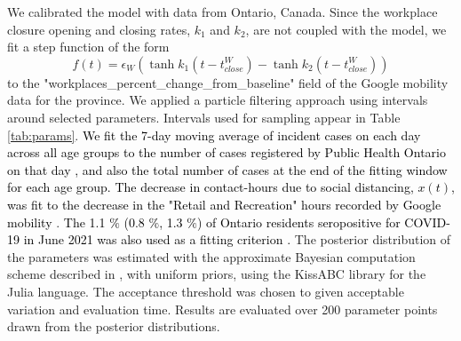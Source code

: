 We calibrated the model with data from Ontario, Canada. Since the workplace closure opening and closing rates, $k_1$ and $k_2$, are not coupled with the model, we fit a step function of the form $$f(t) = \epsilon_W \left( \tanh{k_1(t - t^W_{close})} - \tanh{k_2(t - t^W_{close})}\right)$$ to the \textrm{"workplaces\_percent\_change\_from\_baseline"} field of the Google mobility data \cite{googlemobility} for the province. We applied a particle filtering approach using intervals around selected parameters. Intervals used for sampling appear in Table \ref{tab:params}. \textcolor{black}{We fit the 7-day moving average of incident cases on each day across all age groups to the number of cases registered by Public Health Ontario on that day \cite{ontariocoviddata}, and also the total number of cases at the end of the fitting window for each age group. The decrease in contact-hours due to social distancing, $x(t)$, was fit to the decrease in the "Retail and Recreation" hours recorded by Google mobility \cite{googlemobility}}.  \textcolor{black}{The 1.1 $\%$ (0.8 $\%$, 1.3 $\%$)  of Ontario residents seropositive for COVID-19 in June 2021 was also used as a fitting criterion \cite{ontario_sero}.} The posterior distribution of the parameters was estimated with the approximate Bayesian computation scheme described in \cite{turner2012approximate}, with uniform priors, using the KissABC \cite{kissabc} library for the Julia language. The acceptance threshold was chosen to given acceptable variation and evaluation time. Results are evaluated over 200 parameter points drawn from the posterior distributions. 



